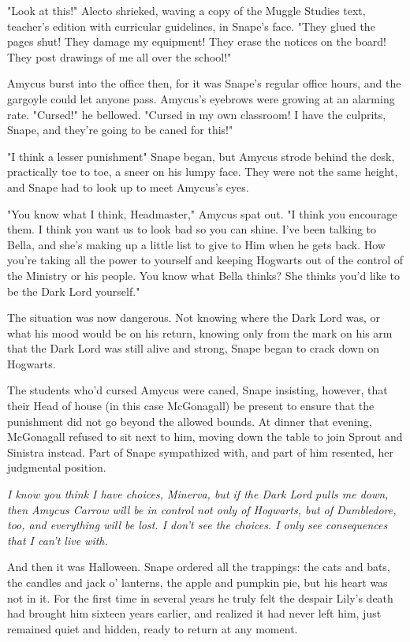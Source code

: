 "Look at this!" Alecto shrieked, waving a copy of the Muggle Studies text, teacher's edition with curricular guidelines, in Snape's face. "They glued the pages shut! They damage my equipment! They erase the notices on the board! They post drawings of me all over the school!"

Amycus burst into the office then, for it was Snape's regular office hours, and the gargoyle could let anyone pass. Amycus's eyebrows were growing at an alarming rate. "Cursed!" he bellowed. "Cursed in my own classroom! I have the culprits, Snape, and they're going to be caned for this!"

"I think a lesser punishment{\el}" Snape began, but Amycus strode behind the desk, practically toe to toe, a sneer on his lumpy face. They were not the same height, and Snape had to look up to meet Amycus's eyes.

"You know what I think, Headmaster," Amycus spat out. "I think you encourage them. I think you want us to look bad so you can shine. I've been talking to Bella, and she's making up a little list to give to Him when he gets back. How you're taking all the power to yourself and keeping Hogwarts out of the control of the Ministry or his people. You know what Bella thinks? She thinks you'd like to be the Dark Lord yourself."

The situation was now dangerous. Not knowing where the Dark Lord was, or what his mood would be on his return, knowing only from the mark on his arm that the Dark Lord was still alive and strong, Snape began to crack down on Hogwarts.

The students who'd cursed Amycus were caned, Snape insisting, however, that their Head of house (in this case McGonagall) be present to ensure that the punishment did not go beyond the allowed bounds. At dinner that evening, McGonagall refused to sit next to him, moving down the table to join Sprout and Sinistra instead. Part of Snape sympathized with, and part of him resented, her judgmental position.

\emph{I know you think I have choices, Minerva, but if the Dark Lord pulls me down, then Amycus Carrow will be in control not only of Hogwarts, but of Dumbledore, too, and everything will be lost. I don't see the choices. I only see consequences that I can't live with.}

And then it was Halloween. Snape ordered all the trappings: the cats and bats, the candles and jack o' lanterns, the apple and pumpkin pie, but his heart was not in it. For the first time in several years he truly felt the despair Lily's death had brought him sixteen years earlier, and realized it had never left him, just remained quiet and hidden, ready to return at any moment.

